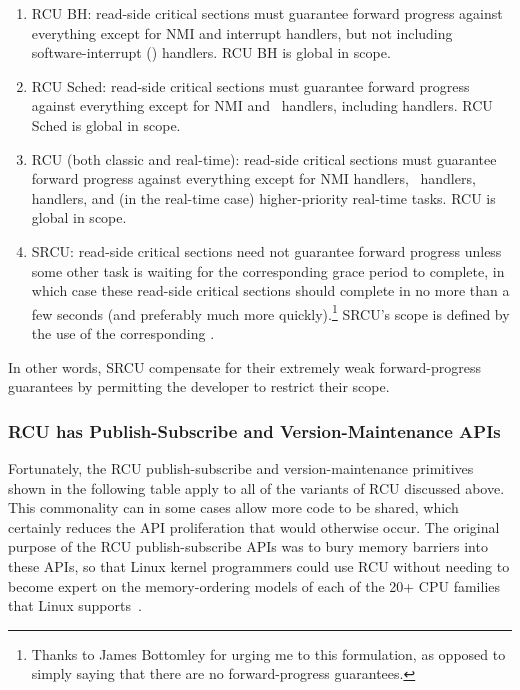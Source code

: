 \begin{enumerate}
\item	RCU BH: read-side critical sections
	must guarantee forward progress against everything except for
	NMI and interrupt handlers, but not including software-interrupt
	() handlers.
	RCU BH is global in scope.
\item	RCU Sched: read-side critical sections must guarantee forward
	progress against everything except for NMI and \IRQ\ handlers,
	including  handlers.
	RCU Sched is global in scope.
\item	RCU (both classic and real-time): read-side critical sections
	must guarantee forward progress against everything except for
	NMI handlers, \IRQ\ handlers,  handlers, and (in the
	real-time case) higher-priority real-time tasks.
	RCU is global in scope.
\item	SRCU: read-side critical sections need not guarantee
	forward progress unless some other task is waiting for the
	corresponding grace period to complete, in which case these
	read-side critical sections should complete in no more than
	a few seconds (and preferably much more quickly).\footnote{
		Thanks to James Bottomley for urging me to this
		formulation, as opposed to simply saying that
		there are no forward-progress guarantees.}
	SRCU's scope is defined by the use of the corresponding
	.
\end{enumerate}

In other words, SRCU compensate for their extremely weak
forward-progress guarantees by permitting the developer to restrict
their scope.

\subsubsection{RCU has Publish-Subscribe and Version-Maintenance APIs}
\label{sec:defer:RCU has Publish-Subscribe and Version-Maintenance APIs}

Fortunately, the RCU publish-subscribe and version-maintenance
primitives shown in the following
table apply to all of the variants of RCU discussed above.
This commonality can in some cases allow more code to be shared,
which certainly reduces the API proliferation that would otherwise
occur.
The original purpose of the RCU publish-subscribe APIs was to
bury memory barriers into these APIs, so that Linux kernel
programmers could use RCU without needing to become expert on
the memory-ordering models of each of the 20+ CPU families
that Linux supports~\cite{Spraul01}.

